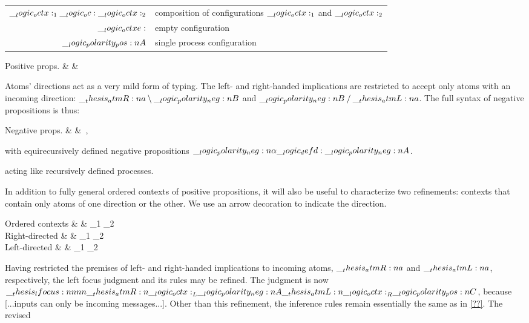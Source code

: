 \begin{tabular}{@{}rl@{}}
  $\__logic_octx:_1 \__logic_oc: \__logic_octx:_2$ & composition of configurations $\__logic_octx:_1$ and $\__logic_octx:_2$ \\
  $\__logic_octxe:$ & empty configuration \\
  $\__logic_polarity_pos:n {A}$ & single process configuration
\end{tabular}

\begin{syntax*}
  Positive props. &
     &  \mid {} \mid {} \fuse {} \mid \one \mid \dn {}
\end{syntax*}

Atoms' directions act as a very mild form of typing.
The left- and right-handed implications are restricted to accept only atoms with an incoming direction: $\__thesis_atmR:n {a} \mathbin { \setminus } \__logic_polarity_neg:n {B}$ and $\__logic_polarity_neg:n {B} \mathbin { / } \__thesis_atmL:n {a}$.
The full syntax of negative propositions is thus:
\begin{syntax*}
  Negative props. &
     & \n{\alpha} \mid {} \limp {} \mid {} \pmir {} \mid {} \with {} \mid \top \mid \up {}
  \,,
\end{syntax*}
with equirecursively defined negative propositions $\__logic_polarity_neg:n {\alpha} \__logic_defd: \__logic_polarity_neg:n {A}$.


 acting like recursively defined processes.

In addition to fully general ordered contexts of positive propositions, it will also be useful to characterize two refinements: contexts that contain only atoms of one direction or the other.
We use an arrow decoration to indicate the direction.
\begin{syntax*}
  Ordered contexts &
    \octx & \octx_1 \oc \octx_2 \mid \octxe \mid {}
  \\[-2\jot]
  Right-directed &
    \atmR{\octx} & \atmR{\octx}_1 \oc \atmR{\octx}_2 \mid \octxe \mid {}
  \\[-2\jot]
  Left-directed &
    \atmL{\octx} & \atmL{\octx}_1 \oc \atmL{\octx}_2 \mid \octxe \mid {}
\end{syntax*}

Having restricted the premises of left- and right-handed implications to incoming atoms, $\__thesis_atmR:n {a}$ and $\__thesis_atmL:n {a}$, respectively, the left focus judgment and its rules may be refined.
The judgment is now $\__thesis_lfocus:nnnn {\__thesis_atmR:n {\__logic_octx:}_L} {\__logic_polarity_neg:n {A}} {\__thesis_atmL:n {\__logic_octx:}_R} {\__logic_polarity_pos:n {C}}$, because [...inputs can only be incoming messages...].
Other than this refinement, the inference rules remain essentially the same as in \cref{??}.
The revised 


